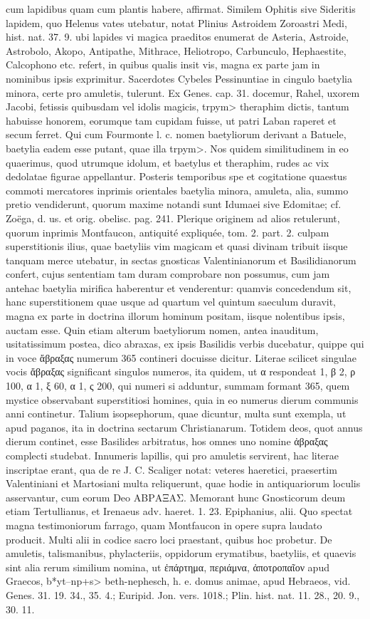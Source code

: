 \documentclass[a4paper, 11pt, oneside, polutonikogreek, german]{article}
\begin{document}
cum lapidibus quam cum plantis habere, affirmat. Similem Ophitis sive Sideritis lapidem, quo Helenus vates utebatur, notat Plinius Astroidem Zoroastri Medi, hist. nat. 37. 9. ubi lapides vi magica praeditos enumerat de Asteria, Astroide, Astrobolo, Akopo, Antipathe, Mithrace, Heliotropo, Carbunculo, Hephaestite, Calcophono etc. refert, in quibus qualis insit vis, magna ex parte jam in nominibus ipsis exprimitur. Sacerdotes Cybeles Pessinuntiae in cingulo baetylia minora, certe pro amuletis, tulerunt. Ex Genes. cap. 31. docemur, Rahel, uxorem Jacobi, fetissis quibusdam vel idolis magicis, \<trpym> theraphim dictis, tantum habuisse honorem, eorumque tam cupidam fuisse, ut patri Laban raperet et secum ferret. Qui cum Fourmonte l. c. nomen baetyliorum derivant a Batuele, baetylia eadem esse putant, quae illa \<trpym>. Nos quidem similitudinem in eo quaerimus, quod utrumque idolum, et baetylus et theraphim, rudes ac vix dedolatae figurae appellantur. Posteris temporibus spe et cogitatione quaestus commoti mercatores inprimis orientales baetylia minora, amuleta, alia, summo pretio vendiderunt, quorum maxime notandi sunt Idumaei sive Edomitae; cf. Zoëga, d. us. et orig. obelisc. pag. 241. Plerique originem ad alios retulerunt, quorum inprimis Montfaucon, antiquité expliquée, tom. 2. part. 2. culpam superstitionis ilius, quae baetyliis vim magicam et quasi divinam tribuit iisque tanquam merce utebatur, in sectas gnosticas Valentinianorum et Basilidianorum confert, cujus sententiam tam duram comprobare non possumus, cum jam antehac baetylia mirifica haberentur et venderentur: quamvis concedendum sit, hanc superstitionem quae usque ad quartum vel quintum saeculum duravit, magna ex parte in doctrina illorum hominum positam, iisque nolentibus ipsis, auctam esse. Quin etiam alterum baetyliorum nomen, antea inauditum, usitatissimum postea, dico abraxas, ex ipsis Basilidis verbis ducebatur, quippe qui in voce ἄβραξας numerum 365 contineri docuisse dicitur. Literae scilicet singulae vocis ἄβραξας significant singulos numeros, ita quidem, ut α respondeat 1, β 2, ρ 100, α 1, ξ 60, α 1, ς 200, qui numeri si adduntur, summam formant 365, quem mystice observabant superstitiosi homines, quia in eo numerus dierum communis anni continetur. Talium isopsephorum, quae dicuntur, multa sunt exempla, ut apud paganos, ita in doctrina sectarum Christianarum. Totidem deos, quot annus dierum continet, esse Basilides arbitratus, hos omnes uno nomine ἀβραξας complecti studebat. Innumeris lapillis, qui pro amuletis servirent, hac literae inscriptae erant, qua de re J. C. Scaliger notat: veteres haeretici, praesertim Valentiniani et Martosiani multa reliquerunt, quae hodie in antiquariorum loculis asservantur, cum eorum Deo ΑΒΡΑΞΑΣ. Memorant hunc Gnosticorum deum etiam Tertullianus, et Irenaeus adv. haeret. 1. 23. Epiphanius, alii. Quo spectat magna testimoniorum farrago, quam Montfaucon in opere supra laudato producit. Multi alii in codice sacro loci praestant, quibus hoc probetur. De amuletis, talismanibus, phylacteriis, oppidorum erymatibus, baetyliis, et quaevis sint alia rerum similium nomina, ut ἐπάρτημα, περιάμνα, ἀποτροπαῖον apud Graecos, \<b*yt--np+s> beth-nephesch, h. e. domus animae, apud Hebraeos, vid. Genes. 31. 19. 34., 35. 4.; Euripid. Jon. vers. 1018.; Plin. hist. nat. 11. 28., 20. 9., 30. 11. 
\end{document}

